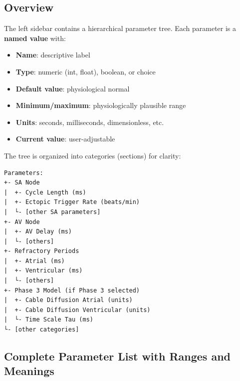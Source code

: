 \documentclass[12pt,a4paper,oneside]{book}
\begin{document}
\subsection{Overview}

The left sidebar contains a hierarchical parameter tree. Each parameter is a \textbf{named value} with:

\begin{itemize}
    \item \textbf{Name}: descriptive label
    \item \textbf{Type}: numeric (int, float), boolean, or choice
    \item \textbf{Default value}: physiological normal
    \item \textbf{Minimum/maximum}: physiologically plausible range
    \item \textbf{Units}: seconds, milliseconds, dimensionless, etc.
    \item \textbf{Current value}: user-adjustable
\end{itemize}

The tree is organized into categories (sections) for clarity:

\begin{Verbatim}[formatcom=\color{black}]
Parameters:
+- SA Node
|  +- Cycle Length (ms)
|  +- Ectopic Trigger Rate (beats/min)
|  └- [other SA parameters]
+- AV Node
|  +- AV Delay (ms)
|  └- [others]
+- Refractory Periods
|  +- Atrial (ms)
|  +- Ventricular (ms)
|  └- [others]
+- Phase 3 Model (if Phase 3 selected)
|  +- Cable Diffusion Atrial (units)
|  +- Cable Diffusion Ventricular (units)
|  └- Time Scale Tau (ms)
└- [other categories]
\end{Verbatim}

\subsection{Complete Parameter List with Ranges and Meanings}
\end{document}

